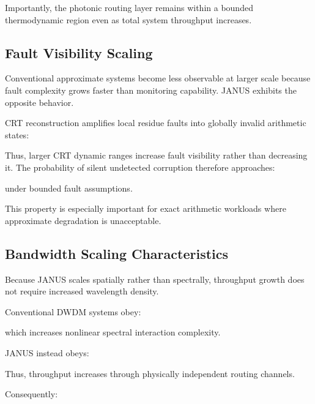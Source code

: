 \documentclass[journal]{IEEEtran}
\begin{document}
Importantly, the photonic routing layer remains within a bounded thermodynamic region even as total system throughput increases.

\subsection{\textbf{Fault Visibility Scaling}}

Conventional approximate systems become less observable at larger scale because fault complexity grows faster than monitoring capability.
JANUS exhibits the opposite behavior.

CRT reconstruction amplifies local residue faults into globally invalid arithmetic states:

\begin{center}
\end{center}

Thus, larger CRT dynamic ranges increase fault visibility rather than decreasing it. The probability of silent undetected corruption therefore
approaches:
\begin{center}
\end{center}

under bounded fault assumptions.

This property is especially important for exact arithmetic workloads where approximate degradation is unacceptable.

\subsection{\textbf{Bandwidth Scaling Characteristics}}

Because JANUS scales spatially rather than spectrally, throughput growth does not require increased wavelength density.

Conventional DWDM systems obey:
\begin{center}
\end{center}

which increases nonlinear spectral interaction complexity.

JANUS instead obeys:
\begin{center}
\end{center}

Thus, throughput increases through physically independent routing channels.

Consequently:
\begin{center}
\end{center}
\end{document}
